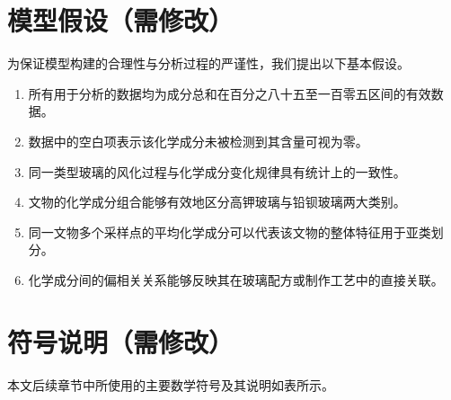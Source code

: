 \section{模型假设（需修改）}
为保证模型构建的合理性与分析过程的严谨性，我们提出以下基本假设。
\begin{enumerate}
	\item 所有用于分析的数据均为成分总和在百分之八十五至一百零五区间的有效数据。
	\item 数据中的空白项表示该化学成分未被检测到其含量可视为零。
	\item 同一类型玻璃的风化过程与化学成分变化规律具有统计上的一致性。
	\item 文物的化学成分组合能够有效地区分高钾玻璃与铅钡玻璃两大类别。
	\item 同一文物多个采样点的平均化学成分可以代表该文物的整体特征用于亚类划分。
	\item 化学成分间的偏相关关系能够反映其在玻璃配方或制作工艺中的直接关联。

\end{enumerate}

\section{符号说明（需修改）}
本文后续章节中所使用的主要数学符号及其说明如表所示。

